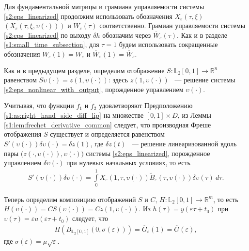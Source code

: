 \documentclass[../main.tex]{subfiles}
\begin{document}
Для фундаментальной матрицы и грамиана управляемости системы \eqref{s2:eps_linearized} продолжим использовать обозначения $ X_{\varepsilon}(\tau,\xi) $ $(X_{\varepsilon}(\tau, \xi, \upsilon(\cdot)))$ и $W_{\varepsilon}(\tau)$ соответственно. 
Грамиан управляемости системы \eqref{s2:eps_linearized} по выходу $ \delta h$ обозначим через $\overline{W}_{\varepsilon}(\tau)$. 
Как и в разделе \ref{s1:small_time_subsection}, для $\tau = 1$ будем использовать сокращенные обозначения $W_{\varepsilon}(1) = W_{\varepsilon}$ и $\overline{W}_{\varepsilon}(1) = \overline{W}_{\varepsilon}$. 

Как и в предыдущем разделе, определим отображение $S: \mathbb{L}_2[0,1] \rightarrow \mathbb{R}^n $ равенством $S\upsilon(\cdot) = z(1,\upsilon(\cdot))$: здесь $ z(1,\upsilon(\cdot))$ ~--- решение системы \eqref{s2:eps_nonlinear_with_output}, порожденное управлением $\upsilon(\cdot)$. 

Учитывая, что функции $\widetilde{f}_1$ и $\widetilde{f}_2$ удовлетворяют Предположению \ref{s1:as:right_hand_side_diff_lip} на множестве $[0, 1]\times D$, из Леммы \ref{s1:lem:frechet_derivative_common} следует, что производная Фреше отображения $S$ существует и определяется равенством $ S'(\upsilon(\cdot))\delta \upsilon(\cdot) = \delta z(1)$, где $\delta z(t)$ ~--- решение линеаризованной вдоль пары $\big( z(\cdot,\upsilon(\cdot)),\upsilon(\cdot)\big) $ системы \eqref{s2:eps_linearized}, порожденное управлением $\delta \upsilon(\cdot)$ при нулевых начальных условиях, то есть
\begin{gather}\label{s2:freсhet_differential_of_scaled_map}
	S'(\upsilon(\cdot))\delta \upsilon(\cdot) = \int\limits_0^1 X_{\varepsilon}(1, \tau, \upsilon(\cdot)) \widetilde{B}_{\varepsilon}(\tau, \upsilon(\cdot)) \delta\upsilon(\tau)\ d\tau. 
\end{gather}

 Теперь определим композицию отображений $ S $ и $ C $, $ H: \mathbb{L}_2[0,1] \rightarrow \mathbb{R}^m $, то есть $ H(\upsilon(\cdot)) = C S(\upsilon(\cdot)) = C z(1,\upsilon(\cdot)) $. 
Из $h(\tau) = y(\varepsilon \tau + t_0)$ при $ \upsilon(\tau) = \varepsilon u(\varepsilon \tau + t_0) $ следует, что 
\begin{gather*}
	H(B_{\mathbb{L}_2[0,1]}(0,\sigma(\varepsilon))) = \overline{G}_{\varepsilon}(1) = \overline{G}(\varepsilon), 
\end{gather*}
где $ \sigma(\varepsilon) = \mu \sqrt{\varepsilon} $.
\end{document}
